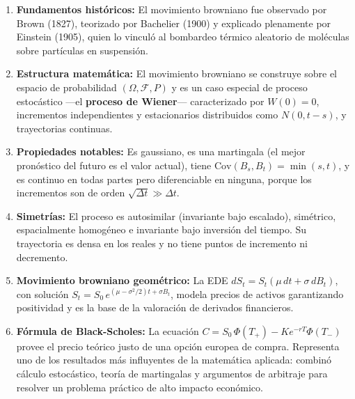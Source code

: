 \documentclass[12pt]{article}
\begin{document}
\begin{enumerate}
  \item \textbf{Fundamentos hist\'oricos:} El movimiento browniano fue observado por Brown (1827), teorizado por Bachelier (1900) y explicado plenamente por Einstein (1905), quien lo vincul\'o al bombardeo t\'ermico aleatorio de mol\'eculas sobre part\'iculas en suspensi\'on.

  \item \textbf{Estructura matem\'atica:} El movimiento browniano se construye sobre el espacio de probabilidad $(\Omega, \mathcal{F}, P)$ y es un caso especial de proceso estoc\'astico ---el \textbf{proceso de Wiener}--- caracterizado por $W(0)=0$, incrementos independientes y estacionarios distribuidos como $N(0, t-s)$, y trayectorias continuas.

  \item \textbf{Propiedades notables:} Es gaussiano, es una martingala (el mejor pron\'ostico del futuro es el valor actual), tiene $\mathrm{Cov}(B_s, B_t) = \min(s,t)$, y es continuo en todas partes pero diferenciable en ninguna, porque los incrementos son de orden $\sqrt{\Delta t} \gg \Delta t$.

  \item \textbf{Simetr\'ias:} El proceso es autosimilar (invariante bajo escalado), sim\'etrico, espacialmente homog\'eneo e invariante bajo inversi\'on del tiempo. Su trayectoria es densa en los reales y no tiene puntos de incremento ni decremento.

  \item \textbf{Movimiento browniano geom\'etrico:} La EDE $dS_t = S_t(\mu\,dt + \sigma\,dB_t)$, con soluci\'on $S_t = S_0\,e^{(\mu-\sigma^2/2)t + \sigma B_t}$, modela precios de activos garantizando positividad y es la base de la valoraci\'on de derivados financieros.

  \item \textbf{F\'ormula de Black-Scholes:} La ecuaci\'on $C = S_0\,\Phi(T_+) - Ke^{-rT}\Phi(T_-)$ provee el precio te\'orico justo de una opci\'on europea de compra. Representa uno de los resultados m\'as influyentes de la matem\'atica aplicada: combin\'o c\'alculo estoc\'astico, teor\'ia de martingalas y argumentos de arbitraje para resolver un problema pr\'actico de alto impacto econ\'omico.
\end{enumerate}
\end{document}

